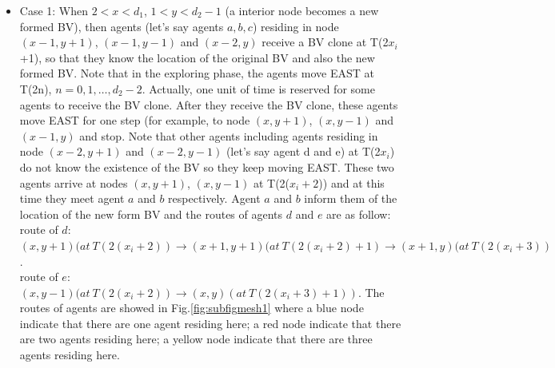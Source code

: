 \begin{itemize}
\item Case 1: When $2<x<d_1$, $1<y<d_2-1$ (a interior node becomes a new formed BV), then agents (let's say agents $a,b,c$) residing in node $(x-1, y+1)$, $(x-1, y-1)$ and $(x-2, y)$ receive a BV clone at T(2$x_i$+1), so that they know the location of the original BV and also the new formed BV. Note that in the exploring phase, the agents move EAST at T(2n), $n=0,1, \ldots ,d_2-2$. Actually, one unit of time is reserved for some agents to receive the BV clone. After they receive the BV clone, these agents move EAST for one step (for example, to node $(x, y+1)$, $(x, y-1)$ and $(x-1, y)$ and stop. Note that other agents including agents residing in node $(x-2, y+1)$ and $(x-2, y-1)$ (let's say agent d and e) at T(2$x_i$) do not know the existence of the BV so they keep moving EAST. These two agents arrive at nodes $(x, y+1)$, $(x, y-1)$ at T(2($x_i+2$)) and at this time they meet agent $a$ and $b$ respectively. Agent $a$ and $b$ inform them of the location of the new form BV and the routes of agents $d$ and $e$ are as follow:\\
route of $d$: $(x, y+1)(at\ T(2(x_i+2)){\rightarrow}(x+1,y+1)(at\ T(2(x_i+2)+1){\rightarrow}(x+1,y)(at\ T(2(x_i+3))$.\\
route of $e$: $(x, y-1)(at\ T(2(x_i+2)){\rightarrow}(x, y)(at\ T(2(x_i+3)+1))$.
The routes of agents are showed in Fig.\ref{fig:subfigmesh1} where a blue node indicate that there are one agent residing here; a red node indicate that there are two agents residing here; a yellow node indicate that there are three agents residing here.


\end{itemize}
